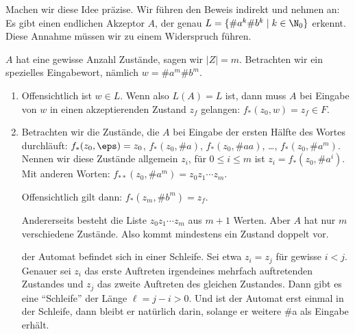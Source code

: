 \begin{beweis}
  \label{bew:akbk-not-reg}
  Machen wir diese Idee präzise.  Wir führen den Beweis indirekt und
  nehmen an: Es gibt einen endlichen Akzeptor $A$, der genau $L=
  \{\#a^k\#b^k \mid k\in\N_0\}$ erkennt. Diese Annahme müssen wir zu
  einem Widerspruch führen.
  
  $A$ hat eine gewisse Anzahl Zustände, sagen wir $|Z|=m$.  Betrachten
  wir ein spezielles Eingabewort, nämlich $w=\#a^m\#b^m$.

  \begin{enumerate}
  \item Offensichtlich ist $w\in L$. Wenn also $L(A)=L$ ist, dann muss
    $A$ bei Eingabe von $w$ in einen akzeptierenden Zustand $z_f$
    gelangen: $f_*(z_0,w) = z_f \in F$.
  \item Betrachten wir die Zustände, die $A$ bei Eingabe der ersten
    Hälfte des Wortes durchläuft: $f_*(z_0,\eps)=z_0$, $f_*(z_0,\#a)$,
    $f_*(z_0,\#{aa})$, \ldots, $f_*(z_0,\#a^m)$. Nennen wir diese
    Zustände allgemein $z_i$, \dh für $0\leq i\leq m$ ist
    $z_i=f_*(z_0, \#a^i)$. Mit anderen Worten:
    $f_{**}(z_0,\#a^m)=z_0z_1\cdots z_m$.
    
    Offensichtlich gilt dann: $f_*(z_m,\#b^m)=z_f$.
    
    Andererseits besteht die Liste $z_0z_1\cdots z_m$ aus $m+1$
    Werten. Aber $A$ hat nur $m$ verschiedene Zustände.  Also kommt
    mindestens ein Zustand doppelt vor.
      
    \Dh der Automat befindet sich in einer Schleife.  Sei etwa
    $z_i=z_j$ für gewisse $i<j$. Genauer sei $z_i$ das erste Auftreten
    irgendeines mehrfach auftretenden Zustandes und $z_j$ das zweite
    Auftreten des gleichen Zustandes.  Dann gibt es eine "`Schleife"'
    der Länge $\ell=j-i>0$. Und ist der Automat erst einmal in der
    Schleife, dann bleibt er natürlich darin, solange er weitere \#a
    als Eingabe erhält. 


\end{enumerate}
\end{beweis}
